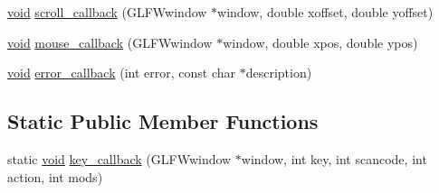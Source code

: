 \begin{DoxyCompactItemize}
\item 
\hyperlink{imgui__impl__opengl3__loader_8h_ac668e7cffd9e2e9cfee428b9b2f34fa7}{void} \hyperlink{classGame_ac3931568d19483386124d89aa0e2a762}{scroll\+\_\+callback} (G\+L\+F\+Wwindow $\ast$window, double xoffset, double yoffset)
\item 
\hyperlink{imgui__impl__opengl3__loader_8h_ac668e7cffd9e2e9cfee428b9b2f34fa7}{void} \hyperlink{classGame_ade7c4fb6814172307baa622f1b4bb566}{mouse\+\_\+callback} (G\+L\+F\+Wwindow $\ast$window, double xpos, double ypos)
\item 
\hyperlink{imgui__impl__opengl3__loader_8h_ac668e7cffd9e2e9cfee428b9b2f34fa7}{void} \hyperlink{classGame_a78d191af16100cc28477474bc0b1e2de}{error\+\_\+callback} (int error, const char $\ast$description)
\end{DoxyCompactItemize}
\subsection*{Static Public Member Functions}
\begin{DoxyCompactItemize}
\item 
static \hyperlink{imgui__impl__opengl3__loader_8h_ac668e7cffd9e2e9cfee428b9b2f34fa7}{void} \hyperlink{classGame_a1622ae34c02e33376dabde5294c9a8e8}{key\+\_\+callback} (G\+L\+F\+Wwindow $\ast$window, int key, int scancode, int action, int mods)
\end{DoxyCompactItemize}
